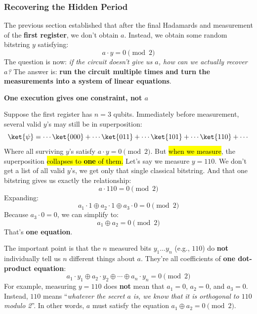 \subsubsection{Recovering the Hidden Period}\label{sec:recovering-the-hidden-period}

The previous section established that after the final Hadamards and measurement of the \textbf{first register}, we don't obtain $a$. Instead, we obtain some random bitstring $y$ satisfying:
\begin{equation*}
    a \cdot y = 0 \pmod 2
\end{equation*}
The question is now: \emph{if the circuit doesn't give us $a$, how can we actually recover $a$?} The answer is: \textbf{run the circuit multiple times and turn the measurements into a system of linear equations}.

\highspace
\begin{flushleft}
    \textcolor{Red2}{ \textbf{One execution gives one constraint, not $a$}}
\end{flushleft}
Suppose the first register has $n=3$ qubits. Immediately before measurement, several valid $y$'s may still be in superposition:
\begin{equation*}
    \ket{\psi} = \cdots \ket{000} + \cdots \ket{011} + \cdots \ket{101} + \cdots \ket{110} + \cdots
\end{equation*}
Where all surviving $y$'s satisfy $a \cdot y = 0 \pmod 2$. But \hl{when we measure}, the superposition \hl{collapses to \textbf{one} of them.} Let's say we measure $y = 110$. We don't get a list of all valid $y$'s, we get only that single classical bitstring. And that one bitstring gives us exactly the relationship:
\begin{equation*}
    a \cdot 110 = 0 \pmod 2
\end{equation*}
Expanding:
\begin{equation*}
    a_1 \cdot 1 \oplus a_2 \cdot 1 \oplus a_3 \cdot 0 = 0 \pmod 2
\end{equation*}
Because $a_3 \cdot 0 = 0$, we can simplify to:
\begin{equation*}
    a_1 \oplus a_2 = 0 \pmod 2
\end{equation*}
That's \textbf{one equation}.

\highspace
The important point is that the $n$ measured bits $y_1 \dots y_n$ (e.g., $110$) do \textbf{not} individually tell us $n$ different things about $a$. They're all coefficients of \textbf{one dot-product equation}:
\begin{equation*}
    a_1 \cdot y_1 \oplus a_2 \cdot y_2 \oplus \cdots \oplus a_n \cdot y_n = 0 \pmod 2
\end{equation*}
For example, measuring $y = 110$ does \textbf{not} mean that $a_1 = 0$, $a_2 = 0$, and $a_3 = 0$. Instead, $110$ means ``\emph{whatever the secret $a$ is, we know that it is orthogonal to $110$ modulo 2}''. In other words, $a$ must satisfy the equation $a_1 \oplus a_2 = 0 \pmod 2$.

